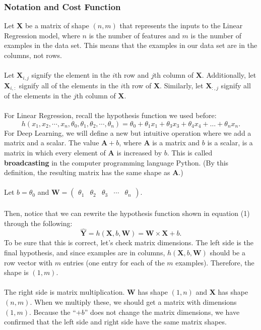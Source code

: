 \documentclass{article}
\begin{document}
\subsubsection{Notation and Cost Function}
Let \textbf{X} be a matrix of shape $(n,m)$ that represents the inputs to the Linear Regression model, where $n$ is the number of features and $m$ is the number of examples in the data set. This means that the examples in our data set are in the columns, not rows.
\\
\\
Let $\textbf{X}_{i,j}$ signify the element in the $i$th row and $j$th column of $\textbf{X}$. Additionally, let $\textbf{X}_{i,:}$ signify all of the elements in the $i$th row of \textbf{X}. Similarly, let $\textbf{X}_{:,j}$ signify all of the elements in the $j$th column of \textbf{X}. 
\\
\\
For Linear Regression, recall the hypothesis function we used before:
\[h(x_1,x_2,\cdots,x_n,\theta_0,\theta_1,\theta_2,\cdots,\theta_n)=\theta_0+\theta_1x_1+\theta_3x_3+\theta_4x_4+\ldots+\theta_nx_n.\tag{1}\]
For Deep Learning, we will define a new but intuitive operation where we add a matrix and a scalar. The value $\textbf{A}+b$, where \textbf{A} is a matrix and $b$ is a scalar, is a matrix in which every element of \textbf{A} is increased by $b$. This is called \textbf{broadcasting} in the computer programming language Python. (By this definition, the resulting matrix has the same shape as \textbf{A}.)
\\
\\
Let $b=\theta_0$ and $\textbf{W}=
\begin{pmatrix}
\theta_1 & \theta_2 & \theta_3 & \cdots & \theta_n
\end{pmatrix}$.
\\
\\
Then, notice that we can rewrite the hypothesis function shown in equation (1) through the following:
\[\hat{\textbf{Y}}=h(\textbf{X},b,\textbf{W})=\textbf{W}\times \textbf{X} + b.\]
To be sure that this is correct, let's check matrix dimensions. The left side is the final hypothesis, and since examples are in columns, $h(\textbf{X},b,\textbf{W})$ should be a row vector with $m$ entries (one entry for each of the $m$ examples). Therefore, the shape is $(1,m)$. 
\\
\\
The right side is matrix multiplication. \textbf{W} has shape $(1,n)$ and \textbf{X} has shape $(n,m)$. When we multiply these, we should get a matrix with dimensions $(1,m)$. Because the ``$+b$'' does not change the matrix dimensions, we have confirmed that the left side and right side have the same matrix shapes. 
\end{document}

